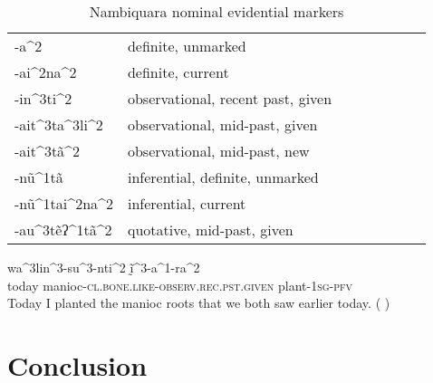 \documentclass[oneside,a4paper,11pt]{article}
\newcommand{\ipa}[1]{{\phon \mbox{#1}}} %
\begin{document}
 \begin{table}
 \caption{Nambiquara nominal evidential markers} \centering
\begin{tabular}{llllllll}
\ipa{-a^2} & definite, unmarked \\
\ipa{-ai^2na^2} & definite, current \\
\ipa{-in^3ti^2} & observational, recent past, given \\
\ipa{-ait^3ta^3li^2} & observational, mid-past, given \\
\ipa{-ait^3tã^2} & observational, mid-past, new \\
\ipa{-nũ^1tã} & inferential, definite, unmarked \\
\ipa{-nũ^1tai^2na^2} & inferential, current \\
\ipa{-au^3tẽʔ^1tã^2} & quotative, mid-past, given \\
\end{tabular}
\end{table}

 
 \begin{exe}
\ex
\gll  \ipa{hĩ^1na^2su^2} \ipa{wa^3lin^3-su^3-nti^2} \ipa{ḭ̃^3-a^1-ra^2} \\
today manioc-\textsc{cl.bone.like-observ.rec.pst.given} plant-\textsc{1sg-pfv} \\
\glt Today I planted the manioc roots that we both saw earlier today. (\citealt[290, ex 62.]{lowe99nambiquara} ) 
  \end{exe}

\section{Conclusion}




\end{document}
